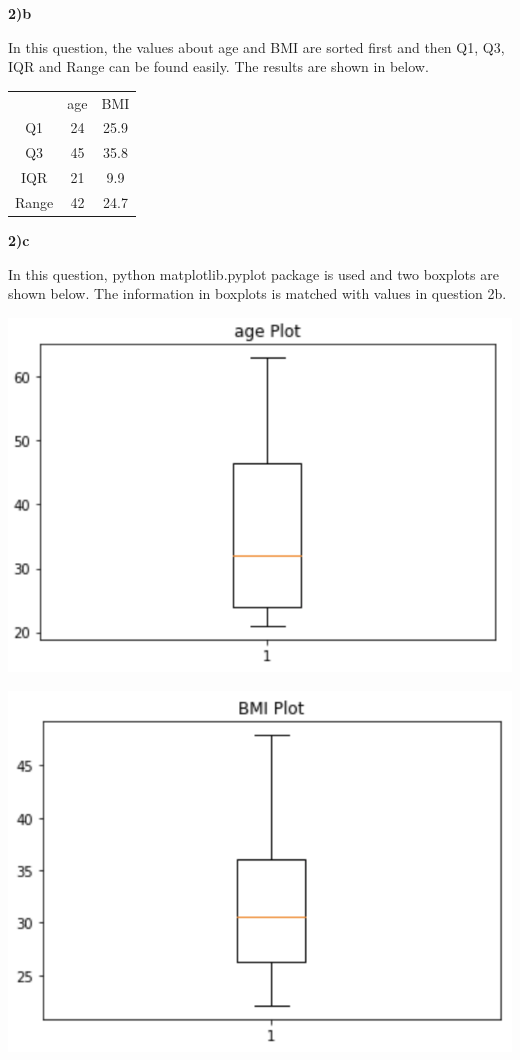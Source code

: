 \documentclass{article}
\begin{document}
\bigskip

\textbf{2)b}

In this question, the values about age and BMI are sorted first and then Q1, Q3, IQR and Range can be found easily. The results are shown in below.

\begin{center}
\begin{tabular}{c c c}
&age &BMI\\ 
Q1 &24 & 25.9\\
Q3 &45 &35.8\\
IQR &21 &9.9\\
Range &42 &24.7
\end{tabular}
\end{center}

\bigskip

\textbf{2)c}

In this question, python matplotlib.pyplot package is used and two boxplots are shown below. The information in boxplots is matched with values in question 2b.

\includegraphics[scale=0.5]{age_boxplot.png}

\includegraphics[scale=0.5]{BMI_boxplot.png}
\end{document}
